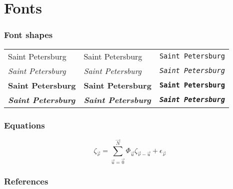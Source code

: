 \documentclass[aspectratio=169]{beamer}
\begin{document}
\section{Fonts}

\begin{frame}[fragile]
	\frametitle{Font shapes}
	\begin{center}
		\begin{tabular}{lll}
			\textup{\textsf{Saint Petersburg}} &
			\textup{\textrm{Saint Petersburg}} &
			\textup{\texttt{Saint Petersburg}} \\
			\textit{\textsf{Saint Petersburg}} &
			\textit{\textrm{Saint Petersburg}} &
			\textit{\texttt{Saint Petersburg}} \\
			\textbf{\textsf{Saint Petersburg}} &
			\textbf{\textrm{Saint Petersburg}} &
			\textbf{\texttt{Saint Petersburg}} \\
			\textit{\textbf{\textsf{Saint Petersburg}}} &
			\textit{\textbf{\textrm{Saint Petersburg}}} &
			\textit{\textbf{\texttt{Saint Petersburg}}} \\
		\end{tabular}
	\end{center}
\end{frame}

\begin{frame}
	\frametitle{Equations}
	\begin{equation*}
		\zeta_{\vec{\nu}} = \sum\limits_{\vec{u}=\vec{0}}^{\vec{N}}
			\Phi_{\vec{u}}
			\zeta_{\vec{\nu} - \vec{u}} + \epsilon_{\vec{\nu}}
	\end{equation*}
\end{frame}

\begin{frame}
	\frametitle{References}
	\nocite*{}
	
	
\end{frame}
\end{document}
